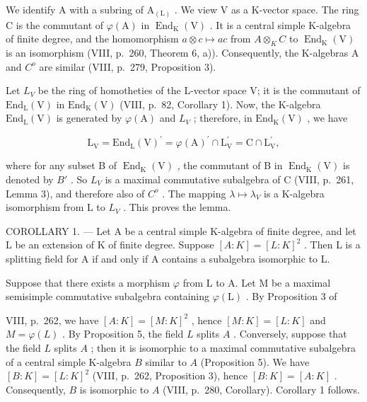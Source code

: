 We identify A with a subring of \(\mathrm{A}_{(\mathrm{L})}\) . We view V as a K-vector space. The ring C is the commutant of \(\varphi(\mathrm{A})\) in \(\operatorname{End}_{\mathrm{K}}(\mathrm{V})\) . It is a central simple K-algebra of finite degree, and the homomorphism \(a \otimes c \mapsto ac\) from \(A \otimes_{K} C\) to \(\operatorname{End}_{\mathrm{K}}(\mathrm{V})\) is an isomorphism (VIII, p.~260, Theorem 6, a)). Consequently, the K-algebras A and \(C^{o}\) are similar (VIII, p.~279, Proposition 3).

Let \(L_{V}\) be the ring of homotheties of the L-vector space V; it is the commutant of \(\mathrm{End}_{\mathrm{L}}(\mathrm{V})\) in \(\mathrm{End}_{\mathrm{K}}(\mathrm{V})\) (VIII, p.~82, Corollary 1). Now, the K-algebra \(\mathrm{End}_{\mathrm{L}}(\mathrm{V})\) is generated by \(\varphi(\mathrm{A})\) and \(L_{V}\) ; therefore, in \(\mathrm{End}_{\mathrm{K}}(\mathrm{V})\) , we have

\[
\mathrm{L} _ {\mathrm{V}} = \mathrm{End} _ {\mathrm{L}} (\mathrm{V}) ^ {\prime} = \varphi (\mathrm{A}) ^ {\prime} \cap \mathrm{L} _ {\mathrm{V}} ^ {\prime} = \mathrm{C} \cap \mathrm{L} _ {\mathrm{V}} ^ {\prime},
\]

where for any subset B of \(\operatorname{End}_{\mathrm{K}}(\mathrm{V})\) , the commutant of B in \(\operatorname{End}_{\mathrm{K}}(\mathrm{V})\) is denoted by \(B'\) . So \(L_{V}\) is a maximal commutative subalgebra of C (VIII, p.~261, Lemma 3), and therefore also of \(C^{o}\) . The mapping \(\lambda \mapsto \lambda_{V}\) is a K-algebra isomorphism from L to \(L_{V}\) . This proves the lemma.

COROLLARY 1. --- Let A be a central simple K-algebra of finite degree, and let L be an extension of K of finite degree. Suppose \([A:K]=[L:K]^{2}\) . Then L is a splitting field for A if and only if A contains a subalgebra isomorphic to L.

Suppose that there exists a morphism \(\varphi\) from L to A. Let M be a maximal semisimple commutative subalgebra containing \(\varphi(\mathrm{L})\) . By Proposition 3 of

VIII, p.~262, we have \([A:K] = [M:K]^2\) , hence \([M:K] = [L:K]\) and \(M = \varphi(L)\) . By Proposition 5, the field \(L\) splits \(A\) . Conversely, suppose that the field \(L\) splits \(A\) ; then it is isomorphic to a maximal commutative subalgebra of a central simple K-algebra \(B\) similar to \(A\) (Proposition 5). We have \([B:K] = [L:K]^2\) (VIII, p.~262, Proposition 3), hence \([B:K] = [A:K]\) . Consequently, \(B\) is isomorphic to \(A\) (VIII, p.~280, Corollary). Corollary 1 follows.

